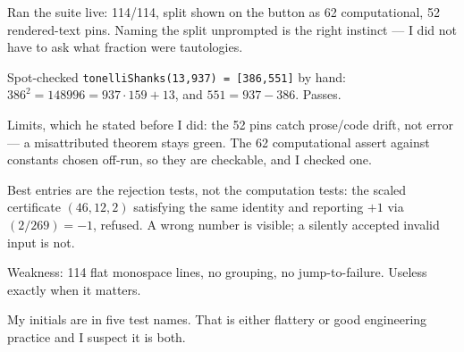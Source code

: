 \begin{knote}
Ran the suite live: 114/114, split shown on the button as 62 computational, 52 rendered-text pins. Naming the split unprompted is the right instinct --- I did not have to ask what fraction were tautologies.

Spot-checked \texttt{tonelliShanks(13,937) = [386,551]} by hand: $386^2 = 148996 = 937 \cdot 159 + 13$, and $551 = 937 - 386$. Passes.

Limits, which he stated before I did: the 52 pins catch prose/code drift, not error --- a misattributed theorem stays green. The 62 computational assert against constants chosen off-run, so they are checkable, and I checked one.

Best entries are the rejection tests, not the computation tests: the scaled certificate $(46,12,2)$ satisfying the same identity and reporting $+1$ via $(2/269) = -1$, refused. A wrong number is visible; a silently accepted invalid input is not.

Weakness: 114 flat monospace lines, no grouping, no jump-to-failure. Useless exactly when it matters.

My initials are in five test names. That is either flattery or good engineering practice and I suspect it is both.
\end{knote}